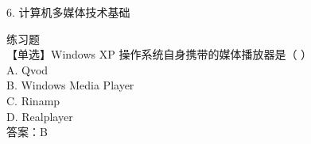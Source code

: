 \documentclass[aspectratio=169]{beamer}
\begin{document}
\begin{frame}[t]{6. 计算机多媒体技术基础} \vspace{20pt}

    练习题\\
    【单选】Windows XP 操作系统自身携带的媒体播放器是（ ）\\
    A. Qvod\\
    B. Windows Media Player\\
    C. Rinamp\\
    D. Realplayer\\
    答案：B\\




\end{frame}
\end{document}
